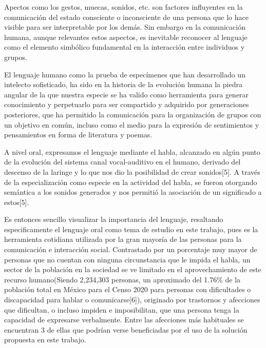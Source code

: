 \hfill \break
\justifying
Apectos como los gestos, muecas, sonidos, etc. son factores influyentes en la comunicación del estado consciente o inconsciente de una persona que lo hace visible para ser interpretable por los demás. Sin embargo en la comunicación humana, aunque relevantes estos aspectos, es inevitable reconocer al lenguaje como el elemento simbólico fundamental en la interacción entre individuos y grupos.

\hfill \break
\justifying
El lenguaje humano como la prueba de especímenes que han desarrollado un intelecto sofisticado, ha sido en la historia de la evolución humana la piedra angular de la que nuestra especie se ha valido como herramienta para generar conocimiento y perpetuarlo para ser compartido y adquirido por generaciones posteriores, que ha permitido la comunicación para la organización de grupos con un objetivo en común, incluso como el medio para la expresión de sentimientos y pensamientos en forma de literatura y poemas.

\hfill \break
\justifying
A nivel oral, expresamos el lenguaje mediante el habla, alcanzado en algún punto de la evolución del sistema canal vocal-auditivo en el humano, derivado del descenso de la laringe y lo que nos dio la posibilidad de crear sonidos[5]. A través de la especialización como especie en la actividad del habla, se fueron otorgando semántica a los sonidos generados y nos permitió la asociación de un significado a estos[5].

\hfill \break
\justifying
Es entonces sencillo visualizar la importancia del lenguaje, resaltando especificamente el lenguaje oral como tema de estudio en este trabajo, pues es la herramienta cotidiana utilizada por la gran mayoría de las personas para la comunicación e interacción social. Contrastado por un porcentaje muy mayor de personas que no cuentan con ninguna circunstancia que le impida el habla, un sector de la población en la sociedad se ve limitado en el aprovechamiento de este recurso humano(Siendo 2,234,303 personas, un aproximado del 1.76\% de la población total en México para el Censo 2020 para personas con dificultades o discapacidad para hablar o comunicarse[6]), originado por trastornos y afecciones que dificultan, o incluso impiden e imposibilitan, que una persona tenga la capacidad de expresarse verbalmente.
Entre las afecciones más habituales se encuentran 3 de ellas que podrían verse beneficiadas por el uso de la solución propuesta en este trabajo.

